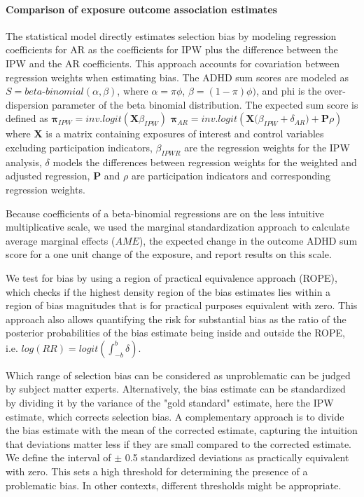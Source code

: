 \documentclass[]{article}
\begin{document}
\paragraph{Comparison of exposure outcome association estimates} The statistical model directly estimates selection bias by modeling regression coefficients for AR as the coefficients for IPW plus the difference between the IPW and the AR coefficients. This approach accounts for covariation between regression weights when estimating bias. The ADHD sum scores are modeled as  $S = beta$-$binomial(\alpha,\beta)$, where $\alpha = \pi\phi$, $\beta = (1-\pi)\phi)$, and phi is the over-dispersion parameter of the beta binomial distribution. The expected sum score is defined as 
\newline
$\mathbf{\pi}_{IPW} = inv.logit(\mathbf{X} \beta_{IPW})$ 
\newline
$\mathbf{\pi}_{AR} = inv.logit(\mathbf{X} \big( \beta_{IPW} + \delta_{AR} \big) + \mathbf{P}\rho)$
\newline
where \textbf{X} is a matrix containing exposures of interest and control variables excluding participation indicators, $\beta_{IPWR}$ are the regression weights for the IPW analysis, $\delta$ models the differences between regression weights for the weighted and adjusted regression, \textbf{P} and $\rho$ are participation indicators and corresponding regression weights.

Because coefficients of a beta-binomial regressions are on the less intuitive multiplicative scale, we used the marginal standardization approach \supercite{Muller2014-bh} to calculate average marginal effects ($AME$), the expected change in the outcome ADHD sum score for a one unit change of the exposure, and report results on this scale.

We test for bias by using a region of practical equivalence approach (ROPE\supercite{Kruschke2010-zi}), which checks if the highest density region of the bias estimates lies within a region of bias magnitudes that is for practical purposes equivalent with zero\supercite{Kruschke2010-zi}. This approach also allows quantifying the risk for substantial bias as the ratio of the posterior probabilities of the bias estimate being inside and outside the ROPE, i.e. $log(RR) = logit(\int_{-b}^{b} \delta)$.

Which range of selection bias can be considered as unproblematic can be judged by subject matter experts. Alternatively, the bias estimate can be standardized by dividing it by the variance of the "gold standard" estimate\supercite{Stuart2010-cj}, here the IPW estimate, which corrects selection bias. A complementary approach is to divide the bias estimate with the mean of the corrected estimate, capturing the intuition that deviations matter less if they are small compared to the corrected estimate. We define the interval of $\pm$ 0.5 standardized deviations as practically equivalent with zero. This sets a high threshold for determining the presence of a problematic bias. In other contexts, different thresholds might be appropriate.
\end{document}
